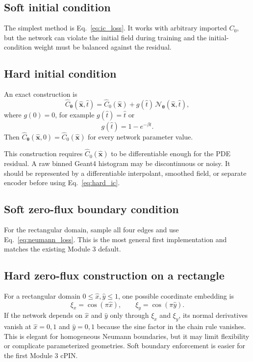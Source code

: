 \documentclass[11pt]{article}
\newcommand{\thetav}{\bm{\theta}}
\newcommand{\xv}{\bm{x}}
\begin{document}
\subsection{Soft initial condition}

The simplest method is Eq.~\eqref{eq:ic_loss}. It works with arbitrary imported $C_0$, but the network can violate the initial field during training and the initial-condition weight must be balanced against the residual.

\subsection{Hard initial condition}

An exact construction is
\begin{equation}
\widehat{C}_{\thetav}(\hat{\xv},\hat{t})
=
\hat{C}_0(\hat{\xv})
+g(\hat{t})\,
\mathcal{N}_{\thetav}(\hat{\xv},\hat{t}),
\label{eq:hard_ic}
\end{equation}
where $g(0)=0$, for example $g(\hat{t})=\hat{t}$ or
\begin{equation}
g(\hat{t})=1-e^{-\beta\hat{t}}.
\end{equation}
Then $\widehat{C}_{\thetav}(\hat{\xv},0)=\hat{C}_0(\hat{\xv})$ for every network parameter value.

This construction requires $\hat{C}_0(\hat{\xv})$ to be differentiable enough for the PDE residual. A raw binned Geant4 histogram may be discontinuous or noisy. It should be represented by a differentiable interpolant, smoothed field, or separate encoder before using Eq.~\eqref{eq:hard_ic}.

\subsection{Soft zero-flux boundary condition}

For the rectangular domain, sample all four edges and use Eq.~\eqref{eq:neumann_loss}. This is the most general first implementation and matches the existing Module 3 default.

\subsection{Hard zero-flux construction on a rectangle}

For a rectangular domain $0\le\hat{x},\hat{y}\le1$, one possible coordinate embedding is
\begin{equation}
\xi_x=\cos(\pi\hat{x}),
\qquad
\xi_y=\cos(\pi\hat{y}).
\end{equation}
If the network depends on $\hat{x}$ and $\hat{y}$ only through $\xi_x$ and $\xi_y$, its normal derivatives vanish at $\hat{x}=0,1$ and $\hat{y}=0,1$ because the sine factor in the chain rule vanishes. This is elegant for homogeneous Neumann boundaries, but it may limit flexibility or complicate parameterized geometries. Soft boundary enforcement is easier for the first Module 3 cPIN.
\end{document}
